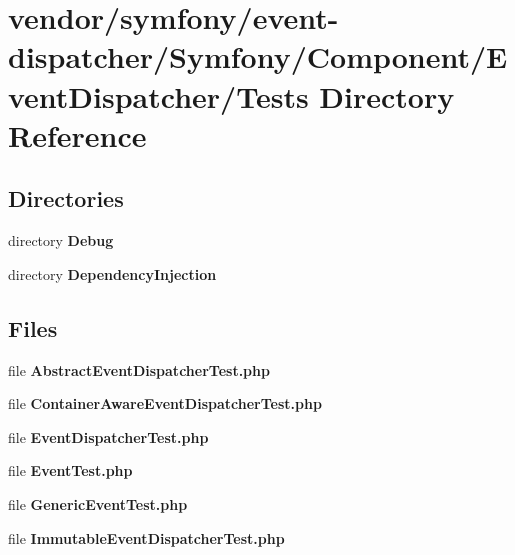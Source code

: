 \section{vendor/symfony/event-\/dispatcher/\+Symfony/\+Component/\+Event\+Dispatcher/\+Tests Directory Reference}
\label{dir_6d3a24b7b97e6831a39d096126a111cd}
\subsection*{Directories}
\begin{DoxyCompactItemize}
\item 
directory {\bf Debug}
\item 
directory {\bf Dependency\+Injection}
\end{DoxyCompactItemize}
\subsection*{Files}
\begin{DoxyCompactItemize}
\item 
file {\bf Abstract\+Event\+Dispatcher\+Test.\+php}
\item 
file {\bf Container\+Aware\+Event\+Dispatcher\+Test.\+php}
\item 
file {\bf Event\+Dispatcher\+Test.\+php}
\item 
file {\bf Event\+Test.\+php}
\item 
file {\bf Generic\+Event\+Test.\+php}
\item 
file {\bf Immutable\+Event\+Dispatcher\+Test.\+php}
\end{DoxyCompactItemize}
